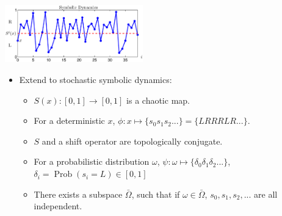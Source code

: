\documentclass[12pt,t]{beamer}
\begin{document}

\begin{frame}
  \begin{center}
    \includegraphics[height=2.5cm,trim=1cm 1cm 1cm 1cm]{symbolicdynamics_edit}
  \end{center}
  \begin{itemize}
  \item Extend to stochastic symbolic dynamics:
    \begin{itemize}
    \item $S(x): [0, 1] \rightarrow [0, 1]$ is a chaotic map.
    \item For a deterministic $x$, $\phi: x \mapsto \{s_0s_1s_2...\} =
      \{LRRRLR...\} $.
    \item $S$ and a shift operator are topologically conjugate.  
    \item For a probabilistic distribution $\omega$, $\psi: \omega
      \mapsto \{\delta_0\delta_1\delta_2...\}$, 
      $\delta_i=\operatorname*{Prob}(s_i=L) \in [0,1]$
        \item There exists a subspace $\bar{\Omega}$, such that if $\omega
          \in \bar{\Omega}$, $s_0,s_1,s_2,...$ are all independent.
    \end{itemize}
  \end{itemize}
\end{frame}
\end{document}
